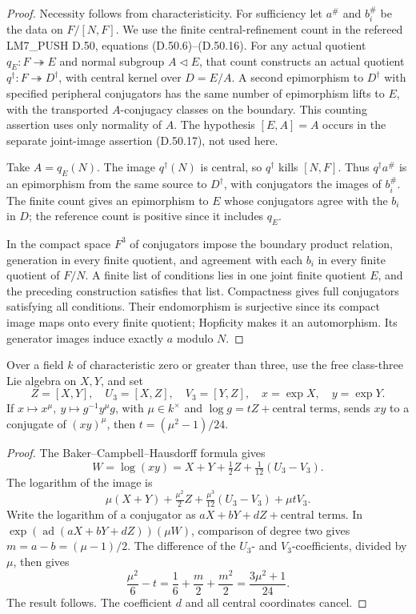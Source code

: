 \begin{proof}
Necessity follows from characteristicity. For sufficiency
let \(a^\#\) and \(b_i^\#\) be the data on \(F/[N,F]\).
We use the finite central-refinement count in the refereed
LM7\_PUSH D.50, equations (D.50.6)--(D.50.16).
For any actual quotient \(q_E:F\twoheadrightarrow E\)
and normal subgroup \(A\triangleleft E\), that count
constructs an actual quotient
\(q^\dagger:F\twoheadrightarrow D^\dagger\), with central
kernel over \(D=E/A\). A second epimorphism to
\(D^\dagger\) with specified peripheral conjugators has
the same number of epimorphism lifts to \(E\), with the
transported \(A\)-conjugacy classes on the boundary.
This counting assertion uses only normality of \(A\).
The hypothesis \([E,A]=A\) occurs in the separate
joint-image assertion (D.50.17), not used here.

Take \(A=q_E(N)\). The image \(q^\dagger(N)\) is central,
so \(q^\dagger\) kills \([N,F]\).
Thus \(q^\dagger a^\#\) is an epimorphism from the
same source to \(D^\dagger\), with conjugators the
images of \(b_i^\#\). The finite count gives an epimorphism
to \(E\) whose conjugators agree with the \(b_i\) in \(D\);
the reference count is positive since it includes \(q_E\).

In the compact space \(F^3\) of conjugators impose the
boundary product relation, generation in every finite
quotient, and agreement with each \(b_i\) in every finite
quotient of \(F/N\). A finite list of conditions lies in
one joint finite quotient \(E\), and the preceding
construction satisfies that list. Compactness gives
full conjugators satisfying all conditions. Their
endomorphism is surjective since its compact image
maps onto every finite quotient; Hopficity makes it
an automorphism. Its generator images induce exactly
\(a\) modulo \(N\).
\end{proof}

Over a field \(k\) of characteristic zero or greater
than three, use the free class-three Lie algebra on
\(X,Y\), and set
\[
 Z=[X,Y],\quad U_3=[X,Z],\quad V_3=[Y,Z],\quad
 x=\exp X,\quad y=\exp Y .
\]
If \(x\mapsto x^\mu,\ y\mapsto g^{-1}y^\mu g\), with
\(\mu\in k^\times\) and
\(\log g=tZ+\text{central terms}\), sends \(xy\)
to a conjugate of \((xy)^\mu\), then
\(t=(\mu^2-1)/24\).

\begin{proof}
The Baker--Campbell--Hausdorff formula gives
\[
 W=\log(xy)=X+Y+\tfrac12Z+\tfrac1{12}(U_3-V_3).
\]
The logarithm of the image is
\[
 \mu(X+Y)+\tfrac{\mu^2}{2}Z+
       \tfrac{\mu^3}{12}(U_3-V_3)+\mu tV_3 .
\]
Write the logarithm of a conjugator as
\(aX+bY+dZ+\text{central terms}\).
In \(\exp(\operatorname{ad}(aX+bY+dZ))(\mu W)\),
comparison of degree two gives \(m=a-b=(\mu-1)/2\).
The difference of the \(U_3\)- and \(V_3\)-coefficients,
divided by \(\mu\), then gives
\[
 \frac{\mu^2}{6}-t=\frac16+\frac m2+\frac{m^2}{2}
                  =\frac{3\mu^2+1}{24}.
\]
The result follows. The coefficient \(d\) and all
central coordinates cancel.
\end{proof}

